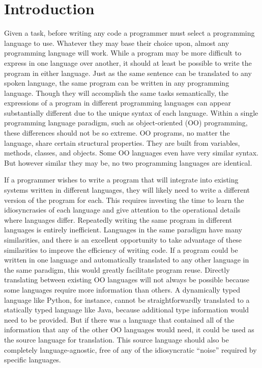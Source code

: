 \documentclass[10pt,conference]{IEEEtran}
\begin{document}
\section{Introduction}
Given a task, before writing any code a programmer must select a programming 
language to use. Whatever they may base their choice upon, almost any
programming language will work. While a program may be more difficult to
express in one language over another, it should at least be possible to write
the program in either language. Just as the same sentence can be translated to
any spoken language, the same program can be written in any programming
language. Though they will accomplish the same tasks semantically, the
expressions of a program in different programming languages can appear
substantially different due to the unique syntax of each language. Within a
single programming language paradigm, such as object-oriented (OO) programming,
these differences should not be so extreme. OO programs, no matter the
language, share certain structural properties. They are built from variables,
methods, classes, and objects. Some OO languages even have very similar syntax.
But however similar they may be, no two programming languages are identical.

If a programmer wishes to write a program that will integrate into 
existing systems written in different languages, they will likely need to 
write a different version of the program for each. This 
requires investing the time to learn the idiosyncrasies of each language and 
give attention to the operational details where languages differ. Repeatedly 
writing the same program in different languages is entirely inefficient. 
Languages in the same paradigm have many similarities, and there is an 
excellent opportunity to take advantage of these similarities to improve the
efficiency of writing code. If a program could be written in one language and
automatically translated to any other language in the same paradigm, this would
greatly facilitate program reuse. Directly translating between existing 
OO languages will not always be possible because some languages 
require more information than others. A dynamically typed language like Python, 
for instance, cannot be straightforwardly translated to a statically typed 
language like Java, because additional type information would need to be 
provided. But if there was a language that contained all of the information 
that any of the other OO languages would need, it could be used as the source 
language for translation. This source language should also be completely 
language-agnostic, free of any of the idiosyncratic ``noise'' required by
specific languages.
\end{document}
